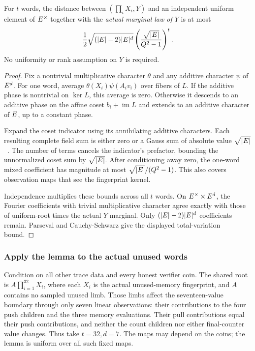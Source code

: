 \begin{lemma}
For $t$ words, the distance between $(\prod_iX_i,Y)$ and an independent uniform element of $E^\times$ together with the \emph{actual marginal law of $Y$} is at most
\[
 \frac12\sqrt{(|E|-2)|E|^d}
 \left(\frac{\sqrt{|E|}}{Q^2-1}\right)^t.
\]
No uniformity or rank assumption on $Y$ is required.
\end{lemma}
\begin{proof}
Fix a nontrivial multiplicative character $\theta$ and any additive character $\psi$ of $E^d$. For one word, average $\theta(X_i)\psi(A_iv_i)$ over fibers of $L$. If the additive phase is nontrivial on $\ker L$, this average is zero. Otherwise it descends to an additive phase on the affine coset $b_i+\operatorname{im}L$ and extends to an additive character of $E$, up to a constant phase.

Expand the coset indicator using its annihilating additive characters. Each resulting complete field sum is either zero or a Gauss sum of absolute value $\sqrt{|E|}$~\cite{conrad}. The number of terms cancels the indicator's prefactor, bounding the unnormalized coset sum by $\sqrt{|E|}$. After conditioning away zero, the one-word mixed coefficient has magnitude at most $\sqrt{|E|}/(Q^2-1)$. This also covers observation maps that see the fingerprint kernel.

Independence multiplies these bounds across all $t$ words. On $E^\times\times E^d$, the Fourier coefficients with trivial multiplicative character agree exactly with those of uniform-root times the actual $Y$ marginal. Only $(|E|-2)|E|^d$ coefficients remain. Parseval and Cauchy-Schwarz give the displayed total-variation bound.
\end{proof}

\subsubsection{Apply the lemma to the actual unused words}

Condition on all other trace data and every honest verifier coin. The shared root is $A\prod_{i=1}^{32}X_i$, where each $X_i$ is the actual unused-memory fingerprint, and $A$ contains no sampled unused limb. Those limbs affect the seventeen-value boundary through only seven linear observations: their contributions to the four push children and the three memory evaluations. Their pull contributions equal their push contributions, and neither the count children nor either final-counter value changes. Thus take $t=32,d=7$. The maps may depend on the coins; the lemma is uniform over all such fixed maps.

